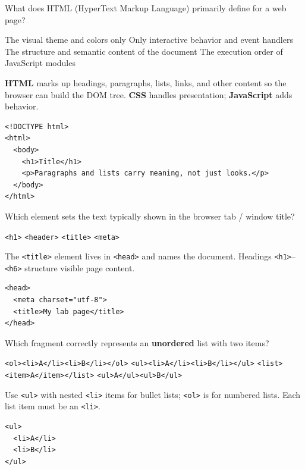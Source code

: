 



\question[4]
What does HTML (HyperText Markup Language) primarily define for a web page?
\begin{choices}
  \choice The visual theme and colors only
  \choice Only interactive behavior and event handlers
  \CorrectChoice The structure and semantic content of the document
  \choice The execution order of JavaScript modules
\end{choices}
\begin{solution}
  \textbf{HTML} marks up headings, paragraphs, lists, links, and other content so the browser can build the DOM tree. \textbf{CSS} handles presentation; \textbf{JavaScript} adds behavior.
\begin{lstlisting}[style=htmlinline]
<!DOCTYPE html>
<html>
  <body>
    <h1>Title</h1>
    <p>Paragraphs and lists carry meaning, not just looks.</p>
  </body>
</html>
\end{lstlisting}
\end{solution}

\question[4]
Which element sets the text typically shown in the browser tab / window title?
\begin{choices}
  \choice \texttt{<h1>}
  \choice \texttt{<header>}
  \CorrectChoice \texttt{<title>}
  \choice \texttt{<meta>}
\end{choices}
\begin{solution}
  The \texttt{<title>} element lives in \texttt{<head>} and names the document. Headings \texttt{<h1>}--\texttt{<h6>} structure visible page content.
\begin{lstlisting}[style=htmlinline]
<head>
  <meta charset="utf-8">
  <title>My lab page</title>
</head>
\end{lstlisting}
\end{solution}

\question[4]
Which fragment correctly represents an \textbf{unordered} list with two items?
\begin{choices}
  \choice \texttt{<ol><li>A</li><li>B</li></ol>}
  \CorrectChoice \texttt{<ul><li>A</li><li>B</li></ul>}
  \choice \texttt{<list><item>A</item></list>}
  \choice \texttt{<ul>A</ul><ul>B</ul>}
\end{choices}
\begin{solution}
  Use \texttt{<ul>} with nested \texttt{<li>} items for bullet lists; \texttt{<ol>} is for numbered lists. Each list item must be an \texttt{<li>}.
\begin{lstlisting}[style=htmlinline]
<ul>
  <li>A</li>
  <li>B</li>
</ul>
\end{lstlisting}
\end{solution}

